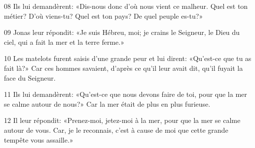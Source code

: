 
08 Ils lui demandèrent: «Dis-nous donc d’où nous vient ce malheur. Quel est ton métier? D’où viens-tu? Quel est ton pays? De quel peuple es-tu?»

09 Jonas leur répondit: «Je suis Hébreu, moi; je crains le Seigneur, le Dieu du ciel, qui a fait la mer et la terre ferme.»

10 Les matelots furent saisis d’une grande peur et lui dirent: «Qu’est-ce que tu as fait là?» Car ces hommes savaient, d’après ce qu’il leur avait dit, qu’il fuyait la face du Seigneur.

11 Ils lui demandèrent: «Qu’est-ce que nous devons faire de toi, pour que la mer se calme autour de nous?» Car la mer était de plus en plus furieuse.

12 Il leur répondit: «Prenez-moi, jetez-moi à la mer, pour que la mer se calme autour de vous. Car, je le reconnais, c’est à cause de moi que cette grande tempête vous assaille.»